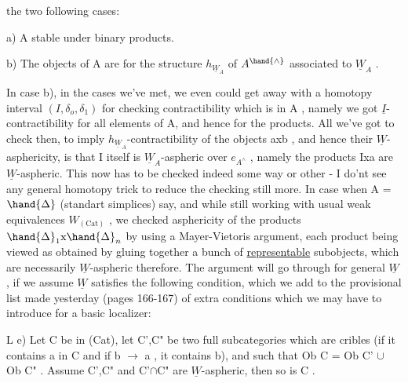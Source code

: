 
the two following cases:

a) A stable under binary products.

b) The objects of A are \uline{} for the  structure $h_{\underline{W}_A}$
of $A^{\hand{\wedge}}$ associated to $\underline{W}_A$ .

In case b), in the cases we've met, we even could get away with
a homotopy interval   $(I,\delta_o,\delta_1)$ for  checking contractibility
which is in A , namely we got $\underline{I}$-contractibility for all elements of A,
and hence for the products. All we've got to check then, to imply
$h_{\underline{W}_A}$-contractibility of the objects axb ,  and hence  their
$\underline{W}$-asphericity, is that I itself is $\underline{W}_A$-aspheric over $e_{A^\wedge}$ , namely the
products Ixa are $\underline{W}$-aspheric. This now has to be checked indeed some
way or other - I do'nt see any general homotopy trick to reduce the
checking still more. In case when A = $\hand{\Delta}$ (standart simplices) say, 
and while still working with usual weak equivalences $W_{(\mathrm{Cat})}$ , we checked
asphericity of the products $\hand{\Delta}_1 \mathrm{x} \hand{\Delta}_n$ by using a Mayer-Vietoris argument,
each product being viewed as obtained by gluing together a bunch of
\uline{representable} subobjects, which are necessarily $\underline{W}$-aspheric therefore.
The argument will go through for general $\underline{W}$ , if we assume $\underline{W}$ satisfies
the following condition, which we add to the provisional list made
yesterday (pages 166-167) of extra conditions  which we may have to
introduce for a basic localizer:

L e)  Let C be in \hand{(}(Cat), let C',C" be two full subcategories which
are cribles\hand{$*$} (if it contains a in C and if b $\to$ a , it contains
b), and such that Ob C = Ob C' $\cup$ Ob C" . Assume C',C" and
C'$\cap$C" are $\underline{W}$-aspheric, then so is C .

